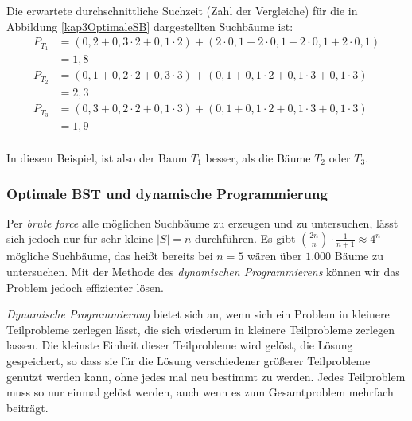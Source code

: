 Die erwartete durchschnittliche Suchzeit (Zahl der Vergleiche) für die in Abbildung \vref{kap3OptimaleSB} dargestellten Suchbäume ist:
\begin{align*}
  P_{T_1} &= (0{,}2 + 0{,}3 \cdot 2 + 0{,}1 \cdot 2) + (2 \cdot 0{,}1 + 2 \cdot 0{,}1 + 2 \cdot 0{,}1 + 2 \cdot 0{,}1)\\
          &= 1{,}8\\
  P_{T_2} &= (0{,}1 + 0{,}2 \cdot 2 + 0{,}3 \cdot 3) + (0{,}1 + 0{,}1 \cdot 2 + 0{,}1 \cdot 3 + 0{,}1 \cdot 3)\\
          &= 2{,}3\\
  P_{T_3} &= (0{,}3 + 0{,}2 \cdot 2 + 0{,}1 \cdot 3) + (0{,}1 + 0{,}1 \cdot 2 + 0{,}1 \cdot 3 + 0{,}1 \cdot 3)\\
          &= 1{,}9\\
\end{align*}

In diesem Beispiel, ist also der Baum $T_1$ besser, als die Bäume $T_2$ oder $T_3$.

\subsubsection{Optimale BST und dynamische Programmierung}
Per \textit{brute force} alle möglichen Suchbäume zu erzeugen und zu untersuchen, lässt sich jedoch nur für sehr kleine $|S|=n$ durchführen. Es gibt $\binom{2n}{n} \cdot \frac{1}{n+1} \approx 4^n$ mögliche Suchbäume, das heißt bereits bei $n=5$ wären über $1.000$ Bäume zu untersuchen. Mit der Methode des \textit{dynamischen Programmierens} können wir das Problem jedoch effizienter lösen. 

\textit{Dynamische Programmierung} bietet sich an, wenn sich ein Problem in kleinere Teilprobleme zerlegen lässt, die sich wiederum in kleinere Teilprobleme zerlegen lassen. Die kleinste Einheit dieser Teilprobleme wird gelöst, die Lösung gespeichert, so dass sie für die Lösung verschiedener größerer Teilprobleme genutzt werden kann, ohne jedes mal neu bestimmt zu werden. Jedes Teilproblem muss so nur einmal gelöst werden, auch wenn es zum Gesamtproblem mehrfach beiträgt.

